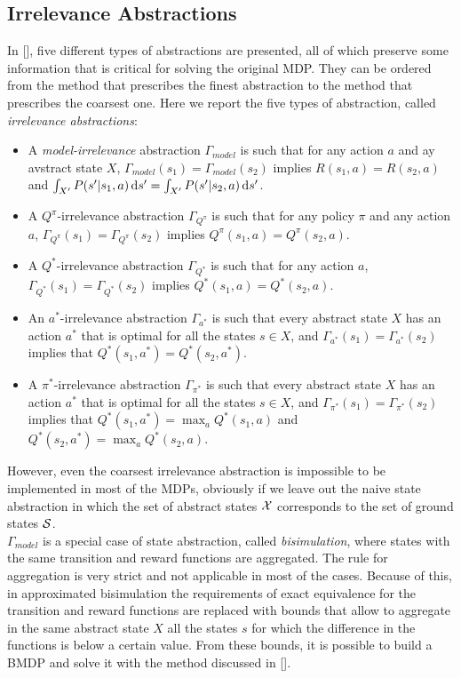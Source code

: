 \subsection{Irrelevance Abstractions}
In [\cite{lihong2006towards}], five different types of abstractions are presented, all of which preserve some information that is critical for solving the original \ac{MDP}. They can be ordered from the method that prescribes the finest abstraction to the method that prescribes the coarsest one. Here we report the five types of abstraction, called \emph{irrelevance abstractions}:
\begin{itemize}
	\item A \emph{model-irrelevance} abstraction $\Gamma_{model}$ is such that for any action $a$ and ay avstract state $X$, $\Gamma_{model}(s_1) = \Gamma_{model}(s_2)$ implies $R(s_1,a)=R(s_2,a)$ and $\int_{X'}P(s'|s_1,a) \,\mathrm{d} s'= \int_{X'}P(s'|s_2,a) \,\mathrm{d} s'$.
	\item A $Q^{\pi}$-irrelevance abstraction $\Gamma_{Q^{\pi}}$ is such that for any policy $\pi$ and any action $a$, $\Gamma_{Q^{\pi}}(s_1) = \Gamma_{Q^{\pi}}(s_2)$ implies $Q^{\pi}(s_1,a)=Q^{\pi}(s_2,a)$.
	\item A $Q^{*}$-irrelevance abstraction $\Gamma_{Q^{*}}$ is such that for any action $a$, $\Gamma_{Q^{*}}(s_1) = \Gamma_{Q^{*}}(s_2)$ implies $Q^{*}(s_1,a)=Q^{*}(s_2,a)$.
	\item An $a^{*}$-irrelevance abstraction $\Gamma_{a^{*}}$ is such that every abstract state $X$ has an action $a^{*}$ that is optimal for all the states $s \in X$, and $\Gamma_{a^{*}}(s_1) = \Gamma_{a^{*}}(s_2)$ implies that $Q^{*}(s_1,a^{*})=Q^{*}(s_2,a^{*})$.
	\item A $\pi^{*}$-irrelevance abstraction $\Gamma_{\pi^{*}}$ is such that every abstract state $X$ has an action $a^{*}$ that is optimal for all the states $s \in X$, and $\Gamma_{\pi^{*}}(s_1) = \Gamma_{\pi^{*}}(s_2)$ implies that $Q^{*}(s_1,a^{*})=\max_{a}Q^{*}(s_1,a)$ and $Q^{*}(s_2,a^{*})=\max_{a}Q^{*}(s_2,a)$.
\end{itemize}
\noindent However, even the coarsest irrelevance abstraction is impossible to be implemented in most of the \ac{MDPs}, obviously if we leave out the naive state abstraction in which the set of abstract states $\mathcal{X}$ corresponds to the set of ground states $\mathcal{S}$.\\
\newline
$\Gamma_{model}$ is a special case of state abstraction, called \emph{bisimulation}, where states with the same transition and reward functions are aggregated. The rule for aggregation is very strict and not applicable in most of the cases. Because of this, in approximated bisimulation the requirements of exact equivalence for the transition and reward functions are replaced with bounds that allow to aggregate in the same abstract state $X$ all the states $s$ for which the difference in the functions is below a certain value. From these bounds, it is possible to build a \ac{BMDP} and solve it with the method discussed in  [\cite{dean2013model}].\\
